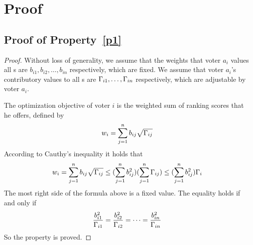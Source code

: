 \section{Proof}
\subsection{Proof of Property~\ref{p1}}
\label{subsection:proof1}
\begin{proof}
	Without loss of generality, we assume that the weights that voter $a_i$
	values all {\dapp}s are $b_{i1}, b_{i2}, \ldots, b_{in}$ respectively, which are
	fixed. We assume that voter $a_i$'s contributory values to all {\dapp}s are
	$\Gamma_{i1},\ldots,\Gamma_{in}$ respectively, which are adjustable by voter $a_i$.

	The optimization objective of voter $i$ is the weighted sum of ranking scores that he offers, defined by
	$$w_i = \sum_{j=1}^n b_{ij}\sqrt{\Gamma_{ij}}$$
	According to Cauthy's inequality it holds that
	$$w_i = \sum_{j=1}^n b_{ij}\sqrt{\Gamma_{ij}} \leq (\sum_{j=1}^n b_{ij}^2)(\sum_{j=1}^n \Gamma_{ij}) \leq (\sum_{j=1}^n b_{ij}^2)\Gamma_i$$
	The most right side of the formula	above is a fixed value. The equality holds if and only if
	$$\frac{b_{i1}^2}{\Gamma_{i1}}=\frac{b_{i2}^2}{\Gamma_{i2}}=\cdots=\frac{b_{in}^2}{\Gamma_{in}}$$
	So the property is proved.
\end{proof}

